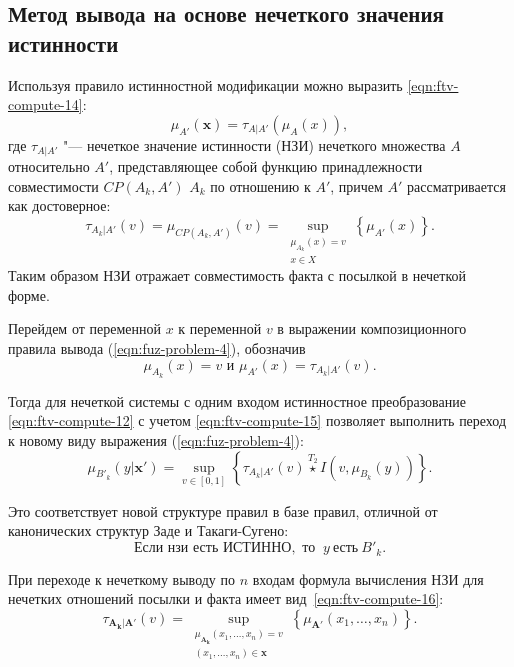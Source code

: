 \subsection{Метод вывода на основе нечеткого значения истинности}

Используя правило истинностной модификации \cite{Dubois2012} можно выразить \eqref{eqn:ftv-compute-14}:
\begin{equation}
	\label{eqn:ftv-compute-14}
\mu_{A'}(\mathbf{x}) = \tau_{A|A'}(\mu_A(x)),
\end{equation}
где $\tau_{A|A'}$ "--- нечеткое значение истинности (НЗИ) нечеткого множества $A$ относительно $A'$, представляющее собой функцию принадлежности совместимости $CP(A_k, A')$ $A_k$ по отношению к $A'$, причем $A'$ рассматривается как достоверное: %
\begin{equation}
	\label{eqn:ftv-compute-12}
	\tau_{A_k|A'}(v) = \mu_{CP(A_k, A')}(v) = \sup_{\substack{\mu_{A_k}(x) = v \\ x \in X}} \left\{ \mu_{A'}(x)\right\}.
\end{equation}
Таким образом НЗИ отражает совместимость факта с посылкой в нечеткой форме.

Перейдем от переменной $x$ к переменной $v$ в выражении композиционного правила вывода (\ref{eqn:fuz-problem-4}), обозначив
\begin{equation}
	\label{eqn:ftv-compute-15}
\mu_{A_k}(x) = v \textrm{ и } \mu_{A'}(x) = \tau_{A_k|A'}(v).
\end{equation}

Тогда для нечеткой системы с одним входом истинностное преобразование \eqref{eqn:ftv-compute-12} с учетом \eqref{eqn:ftv-compute-15} позволяет выполнить переход к новому виду выражения (\ref{eqn:fuz-problem-4}):
\begin{equation}
	\label{eqn:ftv-compute-5}
	\mu_{B'_k}(y|\mathbf{x'}) = \sup_{v \in [0,1]}\left\{\tau_{A_k|A'}(v) \overset{T_2}{\star} I(v, \mu_{B_k}(y))\right\}.
\end{equation}

Это соответствует новой структуре правил в базе правил, отличной от канонических структур Заде и Такаги-Сугено:
\begin{equation}
	\label{eqn:ftv-compute-13}
	\text{Если } \textit{нзи} \text{ есть } \text{ИСТИННО}, \text{ то }\ y\ \text{есть}\ B'_k.
\end{equation}

При переходе к нечеткому выводу по $n$ входам формула вычисления НЗИ для нечетких отношений посылки и факта имеет вид~\eqref{eqn:ftv-compute-16}:
\begin{equation}
	\label{eqn:ftv-compute-16}
	\tau_{\mathbf{A_k}|\mathbf{A'}}(v) = \sup_{\substack{\mu_{\mathbf{A_k}}(x_1, \dots, x_n) = v \\ (x_1, \dots, x_n) \in \mathbf{x}}} \left\{\mu_{\mathbf{A'}}(x_1, \dots, x_n)\right\}.
\end{equation}

